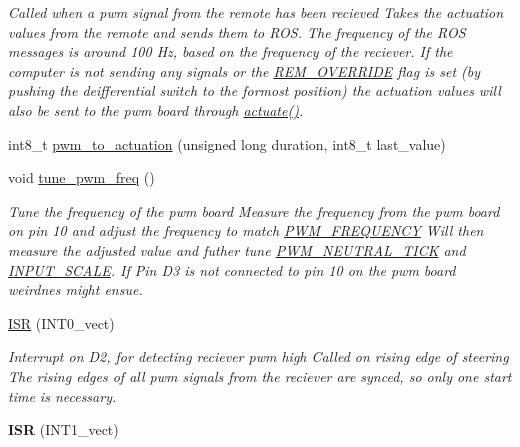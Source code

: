 \begin{DoxyCompactItemize}
\begin{DoxyCompactList}\small\item\em Called when a pwm signal from the remote has been recieved Takes the actuation values from the remote and sends them to R\+OS. The frequency of the R\+OS messages is around 100 Hz, based on the frequency of the reciever. If the computer is not sending any signals or the \hyperlink{group__StatusVariables_gae31e17311163c382d2de940091954419}{R\+E\+M\+\_\+\+O\+V\+E\+R\+R\+I\+DE} flag is set (by pushing the deifferential switch to the formost position) the actuation values will also be sent to the pwm board through \hyperlink{group__Functions_gaa5545eb35f187e5fd11a483a265bed7b}{actuate()}. \end{DoxyCompactList}\item 
int8\+\_\+t \hyperlink{group__Functions_gaf4fdc44b265856b40c792260af0975f1}{pwm\+\_\+to\+\_\+actuation} (unsigned long duration, int8\+\_\+t last\+\_\+value)
\item 
void \hyperlink{group__Functions_gab3d64504be0ebfe1754aec5485ddbb72}{tune\+\_\+pwm\+\_\+freq} ()\hypertarget{group__Functions_gab3d64504be0ebfe1754aec5485ddbb72}{}\label{group__Functions_gab3d64504be0ebfe1754aec5485ddbb72}

\begin{DoxyCompactList}\small\item\em Tune the frequency of the pwm board Measure the frequency from the pwm board on pin 10 and adjust the frequency to match \hyperlink{group__ActuationToOutput_ga1e7ca795ca78a0b20f4fbc06ea505cfb}{P\+W\+M\+\_\+\+F\+R\+E\+Q\+U\+E\+N\+CY} Will then measure the adjusted value and futher tune \hyperlink{group__ActuationToOutput_gaa6aecad7bb848a436df0b7c89aa1f48f}{P\+W\+M\+\_\+\+N\+E\+U\+T\+R\+A\+L\+\_\+\+T\+I\+CK} and \hyperlink{group__ActuationToOutput_ga8e7323c31db382601e81947c2bba345b}{I\+N\+P\+U\+T\+\_\+\+S\+C\+A\+LE}. If Pin D3 is not connected to pin 10 on the pwm board weirdnes might ensue. \end{DoxyCompactList}\item 
\hyperlink{group__Functions_gafea150fcd685610cb9f7672fce361e53}{I\+SR} (I\+N\+T0\+\_\+vect)\hypertarget{group__Functions_gafea150fcd685610cb9f7672fce361e53}{}\label{group__Functions_gafea150fcd685610cb9f7672fce361e53}

\begin{DoxyCompactList}\small\item\em Interrupt on D2, for detecting reciever pwm high Called on rising edge of steering The rising edges of all pwm signals from the reciever are synced, so only one start time is necessary. \end{DoxyCompactList}\item 
{\bfseries I\+SR} (I\+N\+T1\+\_\+vect)\hypertarget{group__Functions_ga22acfb428840c6d9aa212764589cf6c6}{}\label{group__Functions_ga22acfb428840c6d9aa212764589cf6c6}


\end{DoxyCompactItemize}
